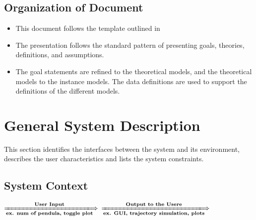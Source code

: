 \documentclass[12pt, titlepage]{article}
\begin{document}
\subsection{Organization of Document}
\begin{itemize}
\item This document follows the template outlined in \citet{SmithAndLai2005} 
\item The presentation follows the standard pattern of presenting goals,
theories, definitions, and assumptions.
\item The goal statements are refined to the theoretical models, and the
theoretical
models to the instance models. The data definitions are used to support the
definitions of the different models.
\end{itemize}

\section{General System Description}
This section identifies the interfaces between the system and its environment,
describes the user characteristics and lists the system constraints.

\subsection{System Context}

\begin{center}
 $ \xLongrightarrow[\textbf{ex. num of pendula, 
toggle plot}]{\textbf{User Input}} $\framebox{\textbf { \progname}}
$ \xLongrightarrow[\textbf{ex. GUI, trajectory simulation, plots}] 
{\textbf{Output to the Usere}}$\\
\end{center}
\end{document}
